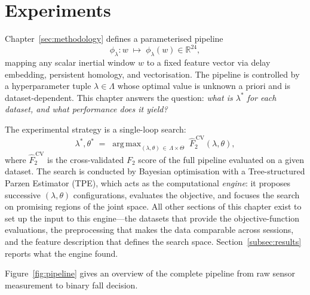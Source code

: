 \documentclass[onluarkali,ingilizce,yukseklisans,karton,LisansustuEgitim]{itutez}
\DeclareMathOperator*{\argmax}{arg\,max}
\providecommand{\R}{\mathbb{R}}
\providecommand{\1}{\mathbf{1}}
\begin{document}
\chapter{Experiments}
\label{sec:experiments}

Chapter~\ref{sec:methodology} defines a parameterised pipeline
\[
  \phi_\lambda\colon w \;\longmapsto\; \phi_\lambda(w)\in\R^{24},
\]
mapping any scalar inertial window $w$ to a fixed feature vector via delay embedding, persistent homology, and vectorisation. The pipeline is controlled by a hyperparameter tuple $\lambda\in\Lambda$ whose optimal value is unknown a priori and is dataset-dependent. This chapter answers the question: \emph{what is $\lambda^*$ for each dataset, and what performance does it yield?}

The experimental strategy is a single-loop search:
\[
  \lambda^*,\theta^* \;=\; \argmax_{(\lambda,\theta)\,\in\,\Lambda\times\Theta}\; \widehat F_2^{\,\mathrm{CV}}(\lambda,\theta),
\]
where $\widehat F_2^{\,\mathrm{CV}}$ is the cross-validated $F_2$ score of the full pipeline evaluated on a given dataset. The search is conducted by Bayesian optimisation with a Tree-structured Parzen Estimator (TPE), which acts as the computational \emph{engine}: it proposes successive $(\lambda,\theta)$ configurations, evaluates the objective, and focuses the search on promising regions of the joint space. All other sections of this chapter exist to set up the input to this engine---the datasets that provide the objective-function evaluations, the preprocessing that makes the data comparable across sessions, and the feature description that defines the search space. Section~\ref{subsec:results} reports what the engine found.

Figure~\ref{fig:pipeline} gives an overview of the complete pipeline from raw sensor measurement to binary fall decision.
\end{document}
